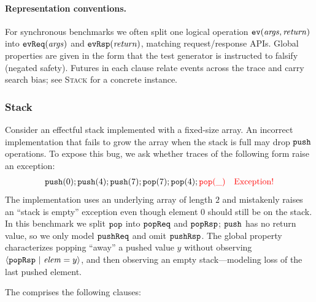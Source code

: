\paragraph{Representation conventions.}
For synchronous benchmarks we often split one logical operation $\boldsymbol{{\tt ev}}(\mathit{args},\mathit{return})$ into $\boldsymbol{{\tt evReq}}(\mathit{args})$ and $\boldsymbol{{\tt evRsp}}(\mathit{return})$, matching request/response APIs. Global properties are given in the form that the test generator is instructed to falsify (negated safety). Futures in each clause relate events across the trace and carry search bias; see \textsc{Stack} for a concrete instance.

\newpage
\subsubsection*{Stack}
Consider an effectful stack implemented with a fixed-size array. An incorrect implementation that fails to grow the array when the stack is full may drop $\boldsymbol{{\tt push}}$ operations. To expose this bug, we ask whether traces of the following form raise an exception:
\begin{align*}
   \boldsymbol{{\tt push}}({0});\boldsymbol{{\tt push}}({4});\boldsymbol{{\tt push}}({7});\boldsymbol{{\tt pop}}({7});\boldsymbol{{\tt pop}}({4});\textcolor{red}{\boldsymbol{{\tt pop}}({\_}) 
   \quad \text{Exception!}}
\end{align*}
\noindent
The implementation uses an underlying array of length $2$ and mistakenly raises an ``stack is empty'' exception even though element $0$ should still be on the stack. In this benchmark we split $\boldsymbol{{\tt pop}}$ into $\boldsymbol{{\tt popReq}}$ and $\boldsymbol{{\tt popRsp}}$; $\boldsymbol{{\tt push}}$ has no return value, so we only model $\boldsymbol{{\tt pushReq}}$ and omit $\boldsymbol{{\tt pushRsp}}$.
The global property characterizes popping ``away'' a pushed value \(y\) without observing \({\langle} {\boldsymbol{{\tt popRsp}}~|~{\mathit{elem} = y}} {\rangle}\), and then observing an empty stack---modeling loss of the last pushed element.
\vspace{-.35cm}\par{}
\vspace{-.4cm}\par\nobreak\noindent
The \tyName{} comprises the following clauses:
